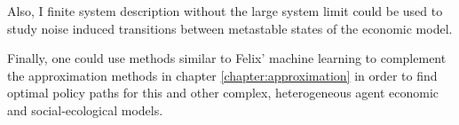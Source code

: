 Also, I finite system description without the large system limit could be used to study noise induced transitions between metastable states of the economic model.


Finally, one could use methods similar to Felix' machine learning to complement the approximation methods in chapter \ref{chapter:approximation} in order to find optimal policy paths for this and other complex, heterogeneous agent economic and social-ecological models.


